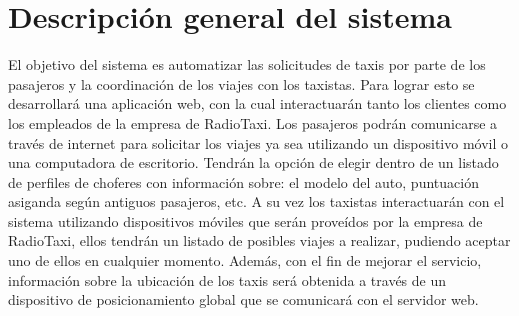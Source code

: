 
\lstset{escapechar=@,style=customc}




\fecha{\today}

\grupo{}


\maketitle

\tableofcontents
\newpage

\section{Descripción general del sistema}
El objetivo del sistema es automatizar las solicitudes de taxis por parte de los pasajeros y la coordinación de los viajes con los taxistas. Para lograr esto se desarrollará una aplicación web, con la cual interactuarán tanto los clientes como los empleados de la empresa de RadioTaxi. Los pasajeros podrán comunicarse a través de internet para solicitar los viajes ya sea utilizando un dispositivo móvil o una computadora de escritorio. Tendrán la opción de elegir dentro de un listado de perfiles de choferes con información sobre: el modelo del auto, puntuación asiganda según antiguos pasajeros, etc. A su vez los taxistas interactuarán con el sistema utilizando dispositivos móviles que serán proveídos por la empresa de RadioTaxi, ellos tendrán un listado de posibles viajes a realizar, pudiendo aceptar uno de ellos en cualquier momento. Además, con el fin de mejorar el servicio, información sobre la ubicación de los taxis será obtenida a través de un dispositivo de posicionamiento global que se comunicará con el servidor web.

